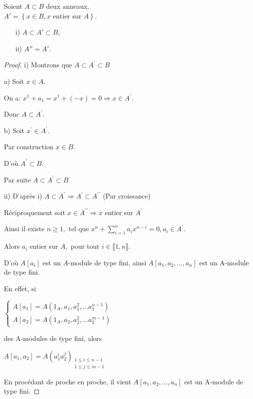 \begin{maproposition}
	Soient $A \subset B$ deux anneaux.\\
	$A' =\left\{x \in B, x\text{ entier sur } A\right\}$.
	\begin{enumerate}
		\item[i)] $A \subset A' \subset B $,
		\item[ii)] $A'' = A'$.
	\end{enumerate}
\end{maproposition}
\begin{proof}
	i) Montrons que $A\subset A^{\prime }\subset B$
	
	a) Soit $x\in A.$
	
	On a: $x^{1}+a_{1}=x^{1}+(-x)=0\Rightarrow x\in A^{\prime }.$
	
	Donc $A\subset A^{\prime }.$
	
	b) Soit $x^{\prime }\in A^{\prime }.$ 
	
	Par construction $x\in B.$
	
	D'où $A^{\prime }\subset B.$
	
	Par suite $A \subset A^{\prime }\subset B$
	
	
	
	ii) D'après i) $A\subset A^{\prime }\Rightarrow A^{\prime }\subset
	A^{\prime \prime }$ (Par croissance)
	
	Réciproquement soit $x\in A^{\prime \prime }\Rightarrow x$ entier sur $%
	A^{\prime }$
	
	Ainsi il existe $n\geq 1,$ tel que  $x^{n}+\sum%
	\limits_{i=1}^{n}a_{i}x^{n-i}=0,a_{i}\in A^{\prime }.$
	
	Alors $a_{i}$ entier sur $A,$ pour tout $i\in \llbracket 1, n \rrbracket.$
	
	D'où $A[a_{i}]$ est un $A$-module de type fini, ainsi $%
	A[a_{1},a_{2},...,a_{n}]$ est un A-module de type fini.
	
	En effet, si
	
	$\left\{ 
	\begin{array}{c}
		A[a_{1}]=A(1_{A},a_{1},a_{1}^{2},...a_{1}^{n-1}) \\ 
		A[a_{2}]=A(1_{A},a_{2},a_{2}^{2},...a_{2}^{m-1})%
	\end{array}%
	\right. $
	
	des A-modules de type fini, alors 
	
	$A[a_{1},a_{2}]=A(a_{1}^{i}a_{2}^{j})_{\substack{ 1\leq i\leq n-1 \\ 1\leq
			j\leq m-1}}$
	
	En procédant de proche en proche, il vient $A[a_{1},a_{2},...,a_{n}]$
	est un A-module de type fini.
	

\end{proof}
